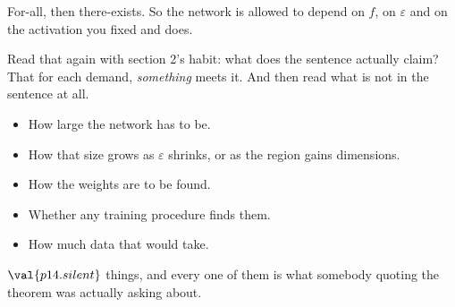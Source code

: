 \begin{fr}
\begin{ansblock}
For-all, then there-exists. So the network is allowed to depend on $f$, on
$\varepsilon$ and on the activation you fixed \dash{} and does.
\end{ansblock}

Read that again with section 2's habit: what does the sentence actually claim?
That for each demand, \emph{something} meets it. And then read what is not in
the sentence at all.

\begin{itemize}
\item How large the network has to be.
\item How that size grows as $\varepsilon$ shrinks, or as the region gains
  dimensions.
\item How the weights are to be found.
\item Whether any training procedure finds them.
\item How much data that would take.
\end{itemize}

$\val{p14.silent}$ things, and every one of them is what somebody quoting the
theorem was actually asking about.

\end{fr}

